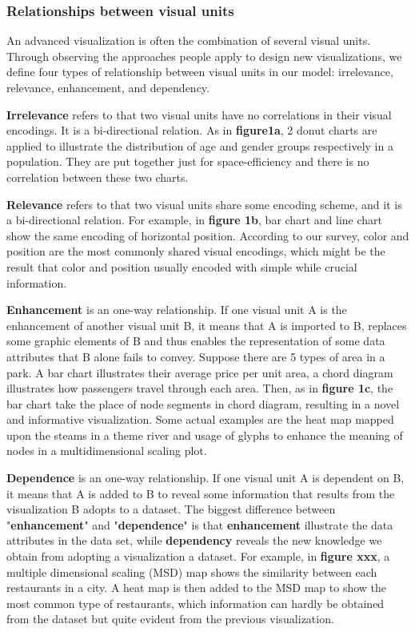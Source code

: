 \subsubsection{Relationships between visual units}
An advanced visualization is often the combination of several visual units. Through observing the approaches people apply to design new visualizations, we define four types of relationship between visual units in our model: irrelevance, relevance, enhancement, and dependency. 

\textbf{Irrelevance} refers to that two visual units have no correlations in their visual encodings. It is a bi-directional relation. As in \textbf{figure1a}, 2 donut charts are applied to illustrate the distribution of age and gender groups respectively in a population. They are put together just for space-efficiency and there is no correlation between these two charts. 

\textbf{Relevance} refers to that two visual units share some encoding scheme, and it is a bi-directional relation. For example, in \textbf{figure 1b}, bar chart and line chart show the same encoding of horizontal position. According to our survey, color and position are the most commonly shared visual encodings, which might be the result that color and position usually encoded with simple while crucial information. 

\textbf{Enhancement} is an one-way relationship. If one visual unit A is the enhancement of another visual unit B, it means that A is imported to B, replaces some graphic elements of B and thus enables the representation of some data attributes that B alone fails to convey. Suppose there are 5 types of area in a park. A bar chart illustrates their average price per unit area, a chord diagram illustrates how passengers travel through each area. Then, as in \textbf{figure 1c}, the bar chart take the place of node segments in chord diagram, resulting in a novel and informative visualization. Some actual examples are the heat map mapped upon the steams in a theme river\cite{wu_opinionseer:_2010}  and usage of glyphs to enhance the meaning of nodes in a multidimensional scaling plot.\cite{chen_peakvizor:_2016}

\textbf{Dependence} is an one-way relationship. If one visual unit A is dependent on B, it means that A is added to B to reveal some information that results from the visualization B adopts to a dataset. The biggest difference between "\textbf{enhancement}" and "\textbf{dependence}" is that \textbf{enhancement} illustrate the data attributes in the data set, while \textbf{dependency} reveals the new knowledge we obtain from adopting a visualization a dataset. For example, in \textbf{figure xxx}, a multiple dimensional scaling (MSD) map shows the similarity between each restaurants in a city. A heat map is then added to the MSD map to show the most common type of restaurants, which information can hardly be obtained from the dataset but quite evident from the previous visualization. 
